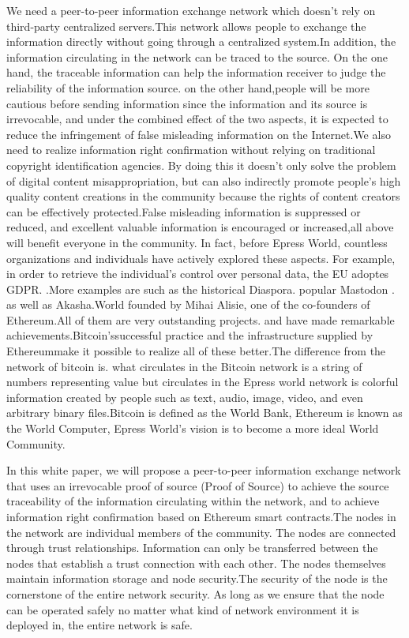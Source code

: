 \documentclass{article}
\begin{document}
    We need a peer-to-peer information exchange network which doesn't rely on third-party centralized servers.This network allows people to exchange the information directly without going through a centralized system.In addition, the information circulating in the network can be traced to the source. On the one hand, the traceable information can help the information receiver to judge the reliability of the information source. on the other hand,people will be more cautious before sending information since the information and its source is irrevocable, and under the combined effect of the two aspects, it is expected to reduce the infringement of false misleading information on the Internet.We also need to realize information right confirmation without relying on traditional copyright identification agencies. By doing this it doesn't only solve the problem of digital content misappropriation, but can also indirectly promote people's high quality content creations in the community because the rights of content creators can be effectively protected.False misleading information is suppressed or reduced, and excellent valuable information is encouraged or increased,all above will benefit everyone in the community.
    In fact, before Epress World, countless organizations and individuals have actively explored these aspects. For example, in order to retrieve the individual's control over personal data, the EU adoptes GDPR.
    \cite{gdpr}.More examples are such as the historical Diaspora\cite{diaspora}. popular Mastodon \cite{mastodon}. as well as Akasha.World \cite{akasha}founded by Mihai Alisie, one of the co-founders of Ethereum.All of them are very outstanding projects. and have made remarkable achievements.Bitcoin's\cite{bitcoin}successful practice and the infrastructure supplied by Ethereum\cite{ethereum}make it possible to realize all of these better.The difference from the network of bitcoin \cite{bitcoin} is. what circulates in the Bitcoin network is a string of numbers representing value but circulates in the Epress world network is colorful information created by people such as  text, audio, image, video, and even arbitrary binary files.Bitcoin is defined as the World Bank, Ethereum is known as the World Computer, Epress World's vision is to become a more ideal World Community.

    In this white paper, we will propose a peer-to-peer information exchange network that uses an irrevocable proof of source (Proof of Source) to achieve the source traceability of the information circulating within the network, and to achieve information right confirmation based on Ethereum smart contracts.The nodes in the network are individual members of the community. The nodes are connected through trust relationships. Information can only be transferred between the nodes that establish a trust connection with each other. The nodes themselves maintain information storage and node security.The security of the node is the cornerstone of the entire network security. As long as we ensure that the node can be operated safely no matter what kind of network environment it is deployed in, the entire network is safe.
\end{document}
